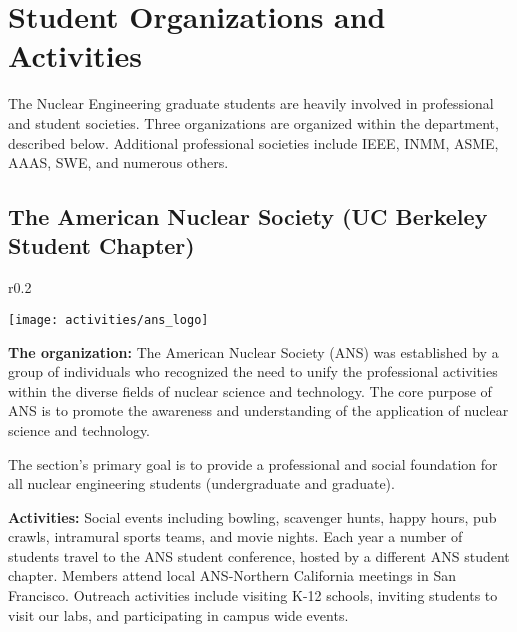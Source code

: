 
\vspace{1cm}
\section*{Student Organizations and Activities}

The Nuclear Engineering graduate students are heavily involved in professional and student societies. 
Three organizations are organized within the department, described below. Additional professional societies include IEEE, INMM, ASME, AAAS, SWE, and numerous others.

\subsection*{The American Nuclear Society (UC Berkeley Student Chapter)}
 
\begin{wrapfigure}{r}{0.2\textwidth}
	\begin{center}
		\vspace{-1.0cm}
		\texttt{[image: activities/ans\_logo]}
	\end{center}
\end{wrapfigure}

\textbf{The organization:} The American Nuclear Society (ANS) was established by a group of individuals who recognized the need to unify the professional activities within the diverse fields of nuclear science and technology. 
The core purpose of ANS is to promote the awareness and understanding of the application of nuclear science and technology.

The section’s primary goal is to provide a professional and social foundation for all nuclear engineering students (undergraduate and graduate).

\textbf{Activities:} Social events including bowling, scavenger hunts, happy hours, pub crawls, intramural sports teams, and movie nights. 
Each year a number of students travel to the ANS student conference, hosted by a different ANS student chapter. 
Members attend local ANS-Northern California meetings in San Francisco. 
Outreach activities include visiting K-12 schools, inviting students to visit our labs, and participating in campus wide events.

